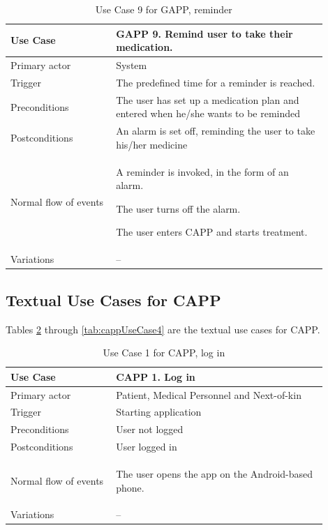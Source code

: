 \begin{table}
		\begin{center}
	    \begin{tabular}{|p{0.3\linewidth}|p{0.6\linewidth}|}
		    \hline
		    Use Case &  GAPP 9. Remind user to take their medication.\\ \hline
		    Primary actor & System \\ \hline
		    Trigger & The predefined time for a reminder is reached. \\ \hline
		    Preconditions & The user has set up a medication plan and entered when he/she wants to be reminded \\ \hline
		    Postconditions & An alarm is set off, reminding the user to take his/her medicine \\ \hline
		    Normal flow of events &
		    	\begin{tabulenum} 
		    	  \item A reminder is invoked, in the form of an alarm.
		    	  \item The user turns off the alarm.
		    	  \item The user enters CAPP and starts treatment.
		    	\end{tabulenum} \\ \hline
		    Variations & -- \\ \hline
	    \end{tabular}
    \end{center}
    \caption{Use Case 9 for GAPP, reminder}
    \label{tab:gappUseCase9}
\end{table}

\subsection{Textual Use Cases for CAPP}
\label{sec:textualusecasescapp}
Tables \ref{tab:cappUseCase1} through \ref{tab:cappUseCase4} are the textual use cases for CAPP.

\begin{table}
	\begin{center}
	    \begin{tabular}{|p{0.3\linewidth}|p{0.6\linewidth}|}
		    \hline
		    Use Case &  CAPP 1. Log in \\ \hline
		    Primary actor & Patient, Medical Personnel and Next-of-kin \\ \hline
		    Trigger & Starting application \\ \hline
		    Preconditions & User not logged \\ \hline
		    Postconditions & User logged in \\ \hline
		    Normal flow of events & 
		    	\begin{tabulenum}
		    	  \item The user opens the app on the Android-based phone.
		    	\end{tabulenum} \\ \hline
		    Variations & -- \\ \hline
	    \end{tabular}
    \end{center}
    \caption{Use Case 1 for CAPP, log in}
    \label{tab:cappUseCase1}
\end{table}

